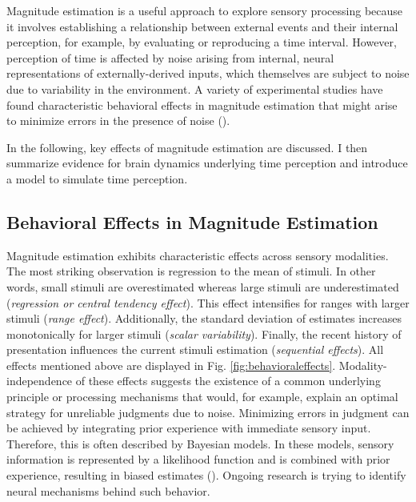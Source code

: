 \documentclass[10pt, a4paper]{article}
\begin{document}
Magnitude estimation is a useful approach to explore sensory processing because it involves establishing a relationship between external events and their internal perception, for example, by evaluating or reproducing a time interval. 
However, perception of time is affected by noise arising from internal, neural representations of externally-derived inputs, which themselves are subject to noise due to variability in the environment.
A variety of experimental studies have found characteristic behavioral effects in magnitude estimation that might arise to minimize errors in the presence of noise (\cite{Petzschner2015}).

In the following, key effects of magnitude estimation are discussed. I then summarize evidence for brain dynamics underlying time perception and introduce a model to simulate time perception.

\subsection{Behavioral Effects in Magnitude Estimation}
Magnitude estimation exhibits characteristic effects across sensory modalities.
The most striking observation is regression to the mean of stimuli. In other words, small stimuli are overestimated whereas large stimuli are underestimated (\textit{regression or central tendency effect}). 
This effect intensifies for ranges with larger stimuli (\textit{range effect}).
Additionally, the standard deviation of estimates increases monotonically for larger stimuli (\textit{scalar variability}). 
Finally, the recent history of presentation influences the current stimuli estimation (\textit{sequential effects}).
All effects mentioned above are displayed in Fig. \ref{fig:behavioraleffects}. 
Modality-independence of these effects suggests the existence of a common underlying principle or processing mechanisms that would, for example, explain an optimal strategy for unreliable judgments due to noise.
Minimizing errors in judgment can be achieved by integrating prior experience with immediate sensory input. Therefore, this is often described by Bayesian models.
In these models, sensory information is represented by a likelihood function and is combined with prior experience, resulting in biased estimates (\cite{Knill2004}). 
Ongoing research is trying to identify neural mechanisms behind such behavior.
\end{document}
